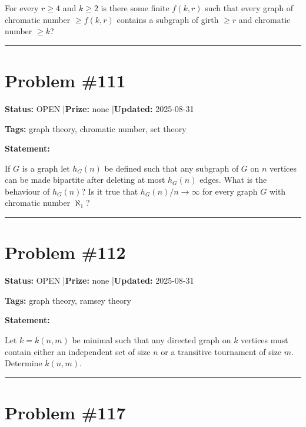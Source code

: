 \documentclass{article}
\begin{document}
For every $r\geq 4$ and $k\geq 2$ is there some finite $f(k,r)$ such that every graph of chromatic number $\geq f(k,r)$ contains a subgraph of girth $\geq r$ and chromatic number $\geq k$?

\noindent\rule{\linewidth}{0.4pt}


\section{Problem \#111}
\label{prob:111}

\noindent\textbf{Status:} OPEN \quad|\quad \textbf{Prize:} none \quad|\quad \textbf{Updated:} 2025-08-31

\noindent\textbf{Tags:} graph theory, chromatic number, set theory

\medskip

\noindent\textbf{Statement:}

If $G$ is a graph let $h_G(n)$ be defined such that any subgraph of $G$ on $n$ vertices can be made bipartite after deleting at most $h_G(n)$ edges. What is the behaviour of $h_G(n)$? Is it true that $h_G(n)/n\to \infty$ for every graph $G$ with chromatic number $\aleph_1$?

\noindent\rule{\linewidth}{0.4pt}


\section{Problem \#112}
\label{prob:112}

\noindent\textbf{Status:} OPEN \quad|\quad \textbf{Prize:} none \quad|\quad \textbf{Updated:} 2025-08-31

\noindent\textbf{Tags:} graph theory, ramsey theory

\medskip

\noindent\textbf{Statement:}

Let $k=k(n,m)$ be minimal such that any directed graph on $k$ vertices must contain either an independent set of size $n$ or a transitive tournament of size $m$. Determine $k(n,m)$.

\noindent\rule{\linewidth}{0.4pt}


\section{Problem \#117}
\label{prob:117}
\end{document}
